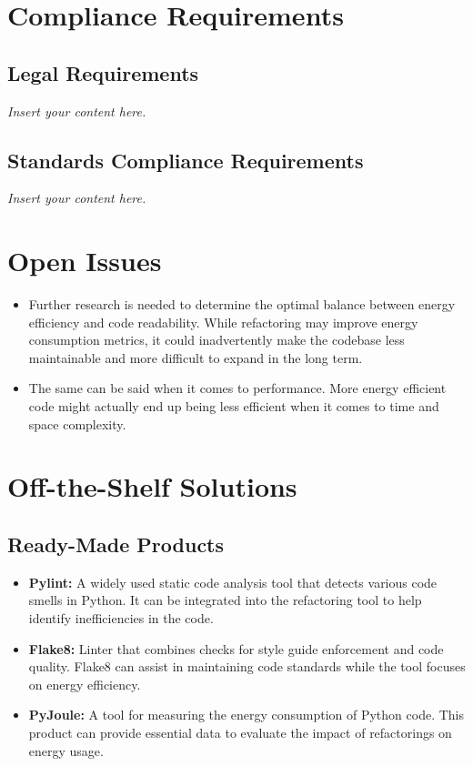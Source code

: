 \documentclass[12pt]{article}
\newcommand{\lips}{\textit{Insert your content here.}}
\begin{document}
\section{Compliance Requirements}
\subsection{Legal Requirements}
\lips
\subsection{Standards Compliance Requirements}
\lips

\section{Open Issues}
\begin{itemize}
  \item Further research is needed to determine the optimal balance between energy efficiency and code readability. While refactoring may improve energy consumption metrics, it could inadvertently make the codebase less maintainable and more difficult to expand in the long term.
  \item The same can be said when it comes to performance. More energy efficient code might actually end up being less efficient when it comes to time and space complexity.
\end{itemize}

\section{Off-the-Shelf Solutions}
\subsection{Ready-Made Products}

\begin{itemize}
  \item \textbf{Pylint:} A widely used static code analysis tool that detects various code smells in Python. It can be integrated into the refactoring tool to help identify inefficiencies in the code.
  \item \textbf{Flake8:} Linter that combines checks for style guide enforcement and code quality. Flake8 can assist in maintaining code standards while the tool focuses on energy efficiency.
  \item \textbf{PyJoule:} A tool for measuring the energy consumption of Python code. This product can provide essential data to evaluate the impact of refactorings on energy usage.
\end{itemize}
\end{document}
